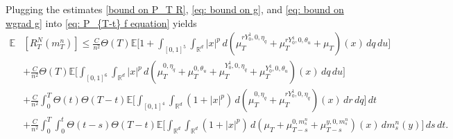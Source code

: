 \documentclass[11pt,reqno]{amsart}
\numberwithin{equation}{section}
\theoremstyle{definition}
\def\E{{\mathbb E}}
\def\R{{\mathbb R}}
\begin{document}
Plugging the estimates \eqref{bound on P_T R}, \eqref{eq: bound on g}, and \eqref{eq: bound on wgrad g} into \eqref{eq: P_{T-t} f equation} yields
\begin{align*}
    \E&[R^N_T(m_T^n)]\leq \frac{C }{n^2}\Theta(T) \E\bigg[1+\int_{[0,1]^5}\int_{\R^d}|x|^p \,d(\mu_T^{rY_0^1,0,\eta_q}+\mu_T^{rY_0^1,0,\theta_u}+\mu_T)(x)\,dq\,du\bigg] \\
    &+ \frac{C }{n^2}\Theta(T)\E\Big[\int_{[0,1]^6}\int_{\R^d}|x|^p\,d(\mu_T^{0,\eta_q}+\mu_T^{0,\theta_u}+\mu_T^{Y_0^1,0,\eta_q}+\mu_T^{Y_0^1,0,\theta_u})(x)\,dq\,du\Big]  \\
    &+\frac{C }{n^2}\int_0^T \Theta(t)\Theta(T-t) \E\Big[\int_{[0,1]^4}\int_{\R^d} (1+|x|^p)\,d(\mu_T^{0,\eta_q}+\mu_T^{rY_0^1,0,\eta_q})(x)\,dr\,dq\Big]\,dt\\
    &+\frac{C}{n^2}\int_0^T \int_0^t \Theta(t-s)\Theta(T-t)\E\Big[\int_{\R^d}\int_{\R^d}(1+|x|^p)\,d(\mu_T+\mu_{T-s}^{0,m_s^n}+\mu_{T-s}^{y,0,m_s^n})(x) \,dm_s^n(y)\Big]\,ds\,dt.
\end{align*}
\end{document}
